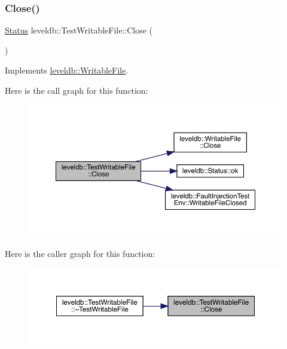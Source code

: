 \subsubsection{\texorpdfstring{Close()}{Close()}}
{\footnotesize\ttfamily \mbox{\hyperlink{classleveldb_1_1_status}{Status}} leveldb\+::\+Test\+Writable\+File\+::\+Close (\begin{DoxyParamCaption}{ }\end{DoxyParamCaption})\hspace{0.3cm}{\ttfamily [virtual]}}



Implements \mbox{\hyperlink{classleveldb_1_1_writable_file_a2efbf9c02a26028b5002df73b4393915}{leveldb\+::\+Writable\+File}}.

Here is the call graph for this function\+:
\nopagebreak
\begin{figure}[H]
\begin{center}
\leavevmode
\includegraphics[width=350pt]{classleveldb_1_1_test_writable_file_a98284f2e88a705a3c18961f198e94038_cgraph}
\end{center}
\end{figure}
Here is the caller graph for this function\+:
\nopagebreak
\begin{figure}[H]
\begin{center}
\leavevmode
\includegraphics[width=350pt]{classleveldb_1_1_test_writable_file_a98284f2e88a705a3c18961f198e94038_icgraph}
\end{center}
\end{figure}
\mbox{\label{classleveldb_1_1_test_writable_file_ad25b85a5ef462fe34e208f955c19d58e}} 
